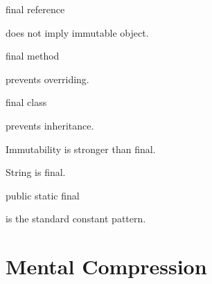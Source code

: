 \documentclass[11pt,a4paper]{book}
\begin{document}

\begin{rosettarule}

final reference

does not imply immutable object.

\end{rosettarule}


\begin{rosettarule}

final method

prevents overriding.

\end{rosettarule}


\begin{rosettarule}

final class

prevents inheritance.

\end{rosettarule}


\begin{rosettarule}

Immutability is stronger than final.

\end{rosettarule}


\begin{rosettarule}

String is final.

\end{rosettarule}


\begin{rosettarule}

public static final

is the standard constant pattern.

\end{rosettarule}


\section{Mental Compression}
\end{document}
